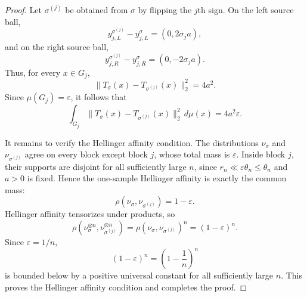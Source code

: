 \documentclass[10pt,a4paper]{amsart}
\begin{document}
\begin{proof}
Let $\sigma^{(j)}$ be
obtained from $\sigma$ by flipping the $j$th sign. On the left source ball,
\[
y_{j,L}^{\sigma^{(j)}}-y_{j,L}^{\sigma}
=
(0,2\sigma_j a),
\]
and on the right source ball,
\[
y_{j,R}^{\sigma^{(j)}}-y_{j,R}^{\sigma}
=
(0,-2\sigma_j a).
\]
Thus, for every $x\in G_j$,
\[
\|T_\sigma(x)-T_{\sigma^{(j)}}(x)\|_2^2=4a^2.
\]
Since $\mu(G_j)=\varepsilon$, it follows that
\[
\int_{G_j}
\|T_\sigma(x)-T_{\sigma^{(j)}}(x)\|_2^2\,d\mu(x)
=
4a^2\varepsilon.
\]

It remains to verify the Hellinger affinity condition. The distributions
$\nu_\sigma$ and $\nu_{\sigma^{(j)}}$ agree on every block except block
$j$, whose total mass is $\varepsilon$. Inside block $j$, their supports
are disjoint for all sufficiently large $n$, since
$r_n\ll \varepsilon\theta_n\leq \theta_n$ and $a>0$ is fixed. Hence the
one-sample Hellinger affinity is exactly the common mass:
\[
\rho(\nu_\sigma,\nu_{\sigma^{(j)}})
=
1-\varepsilon.
\]
Hellinger affinity tensorizes under products, so
\[
\rho(\nu_\sigma^{\otimes n},\nu_{\sigma^{(j)}}^{\otimes n})
=
\rho(\nu_\sigma,\nu_{\sigma^{(j)}})^n
=
(1-\varepsilon)^n.
\]
Since $\varepsilon=1/n$,
\[
(1-\varepsilon)^n
=
\left(1-\frac1n\right)^n
\]
is bounded below by a positive universal constant for all sufficiently
large $n$. This proves the Hellinger affinity condition and completes the
proof.
\end{proof}
\end{document}
